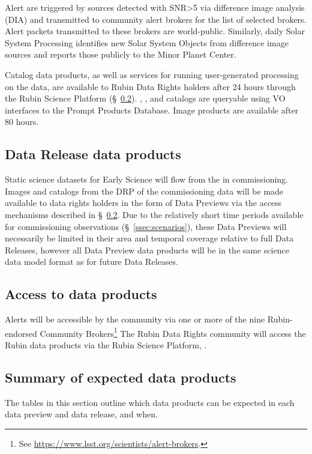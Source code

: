 Alert are triggered by sources detected with SNR>5 via difference image analysis (DIA) and transmitted to community alert brokers for the list of selected brokers.
Alert packets transmitted to these brokers are world-public.
Similarly, daily Solar System Processing identifies new Solar System Objects from difference image sources and reports those publicly to the Minor Planet Center.

Catalog data products, as well as services for running user-generated processing on the data, are available to Rubin Data Rights holders after 24 hours through the Rubin Science Platform (\S~\ref{ssec:dataaccess}).
\DIASource, \DIAObject, and \SSObject catalogs are queryable using VO interfaces to the Prompt Products Database.
Image products are available after 80 hours.


\subsection{Data Release data products}
Static science datasets for Early Science will flow from the \svs in commissioning.
Images and catalogs from the DRP of the commissioning data will be made available to data rights holders in the form of Data Previews via the access mechanisms described in \S~\ref{ssec:dataaccess}.
Due to the relatively short time periods available for commissioning observations (\S~\ref{ssec:scenarios}), these Data Previews will necessarily be limited in their area and temporal coverage relative to full Data Releases, however all Data Preview data products will be in the same science data model format as for future Data Releases.

\subsection{Access to \es data products}\label{ssec:dataaccess}
Alerts will be accessible by the community via one or more of the nine Rubin-endorsed Community Brokers\footnote{See \url{https://www.lsst.org/scientists/alert-brokers}.}
The Rubin Data Rights community will access the Rubin data products via the Rubin Science Platform, \citep{LSE-319}.

\subsection{Summary of expected \es data products}

The tables in this section outline which data products can be expected in each \es data preview and data release, and when.

